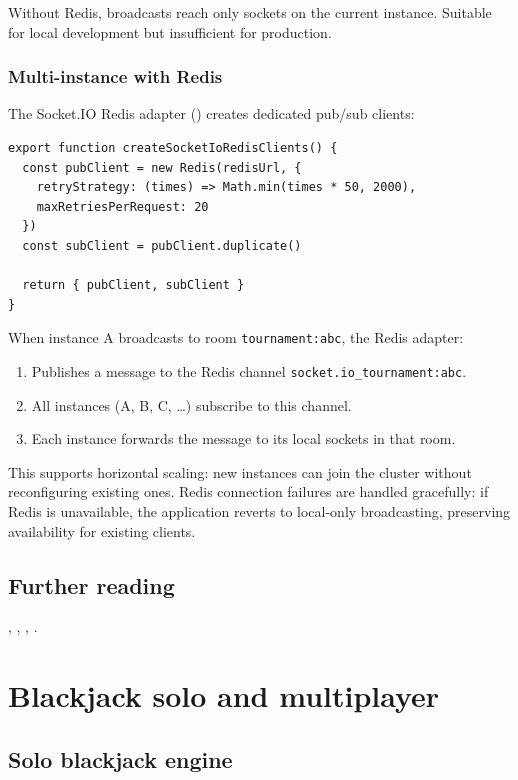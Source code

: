 \documentclass[11pt,a4paper]{article}
\begin{document}
Without Redis, broadcasts reach only sockets on the current instance. Suitable for local development but insufficient for production.

\subsubsection{Multi-instance with Redis}

The Socket.IO Redis adapter () creates dedicated pub/sub clients:

\begin{verbatim}
export function createSocketIoRedisClients() {
  const pubClient = new Redis(redisUrl, {
    retryStrategy: (times) => Math.min(times * 50, 2000),
    maxRetriesPerRequest: 20
  })
  const subClient = pubClient.duplicate()

  return { pubClient, subClient }
}
\end{verbatim}

\noindent When instance A broadcasts to room \texttt{tournament:abc}, the Redis adapter:

\begin{enumerate}
\item Publishes a message to the Redis channel \texttt{socket.io\_tournament:abc}.
\item All instances (A, B, C, \ldots) subscribe to this channel.
\item Each instance forwards the message to its local sockets in that room.
\end{enumerate}

This supports horizontal scaling: new instances can join the cluster without reconfiguring existing ones. Redis connection failures are handled gracefully: if Redis is unavailable, the application reverts to local-only broadcasting, preserving availability for existing clients.

\subsection{Further reading}

, , , .

\section{Blackjack solo and multiplayer}
\label{app:bj}

\subsection{Solo blackjack engine}
\end{document}
